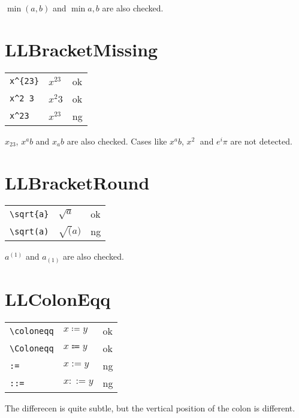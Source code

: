 \documentclass[a4paper]{article}
\newcommand{\tA}[1]{\textcolor{cA}{#1}}
\newcommand{\tD}[1]{\textcolor{cD}{#1}}
\begin{document}
$\min(a,b)$ and $\min{a,b}$ are also checked.

\section{LLBracketMissing}

\begin{table}[H]
	\centering
	\begin{tabular}{lll}
		\verb|x^{23}| & $x^{23}$ & \tA{ok} \\
		\verb|x^2 3|  & $x^2 3$  & \tA{ok} \\
		\verb|x^23|   & $x^23$   & \tD{ng} \\
	\end{tabular}
\end{table}

$x_23$, $x^ab$ and $x_ab$ are also checked.
Cases like $x^a b$, $x^2\;$ and $e^i\pi$ are not detected.

\section{LLBracketRound}

\begin{table}[h]
	\centering
	\begin{tabular}{lll}
		\verb|\sqrt{a}| & $\sqrt{a}$ & \tA{ok} \\
		\verb|\sqrt(a)| & $\sqrt(a)$ & \tD{ng} \\
	\end{tabular}
\end{table}

$a^(1)$ and $a_(1)$ are also checked.

\section{LLColonEqq}

\begin{table}[H]
	\centering
	\begin{tabular}{lll}
		\verb|\coloneqq| & $x\coloneqq y$ & \tA{ok} \\
		\verb|\Coloneqq| & $x\Coloneqq y$ & \tA{ok} \\
		\verb|:=|        & $x:= y$        & \tD{ng} \\
		\verb|::=|       & $x::= y$       & \tD{ng}
	\end{tabular}
\end{table}

The differecen is quite subtle, but the vertical position of the colon is different.
\end{document}

